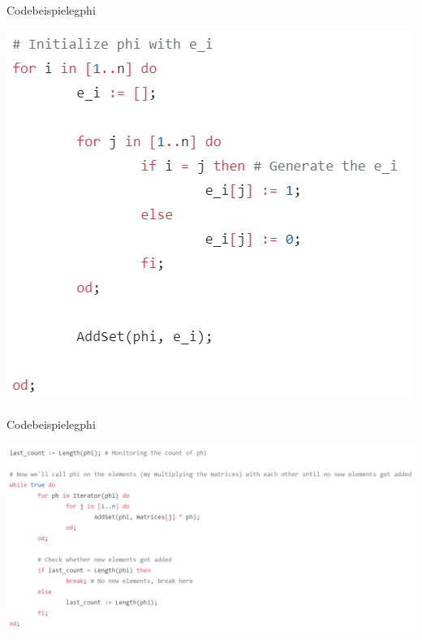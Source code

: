 \documentclass[9pt]{beamer}
\begin{document}
\begin{frame}{Codebeispiele}{gphi}
\begin{center}
\includegraphics[scale=0.75]{assets/gphi_code_1.png}
\end{center}
\end{frame}

\begin{frame}{Codebeispiele}{gphi}
\begin{center}
\includegraphics[scale=0.59]{assets/gphi_code_2.png}
\end{center}
\end{frame}
\end{document}

